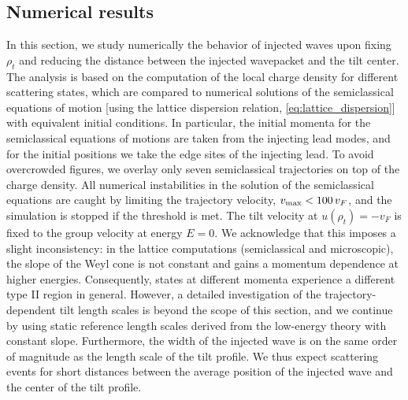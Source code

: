 \documentclass[submission, Phys]{SciPost}
\begin{document}
\subsection{Numerical results}
\label{sec:numerical_results}
In this section, we study numerically the behavior of injected waves upon fixing $\rho_t$ and reducing the distance between the injected wavepacket and the tilt center.
The analysis is based on the computation of the local charge density for different scattering states, which are compared to numerical solutions of the semiclassical equations of motion [using the lattice dispersion relation, \cref{eq:lattice_dispersion}] with equivalent initial conditions.
In particular, the initial momenta for the semiclassical equations of motions are taken from the injecting lead modes, and for the initial positions we take the edge sites of the injecting lead.
To avoid overcrowded figures, we overlay only seven semiclassical trajectories on top of the charge density.
All numerical instabilities in the solution of the semiclassical equations are caught by limiting the trajectory velocity, $v_{\rm max} < 100\, v_F$, and the simulation is stopped if the threshold is met.
The tilt velocity at $u(\rho_t)=-v_F$ is fixed to the group velocity at energy $E=0$.
We acknowledge that this imposes a slight inconsistency: in the lattice computations (semiclassical and microscopic), the slope of the Weyl cone is not constant and gains a momentum dependence at higher energies.
Consequently, states at different momenta experience a different type II region in general.
However, a detailed investigation of the trajectory-dependent tilt length scales is beyond the scope of this section, and we continue by using static reference length scales derived from the low-energy theory with constant slope.
Furthermore, the width of the injected wave is on the same order of magnitude as the length scale of the tilt profile.
We thus expect scattering events for short distances between the average position of the injected wave and the center of the tilt profile.
\end{document}
